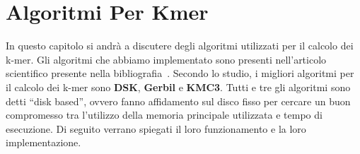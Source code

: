 \chapter{Algoritmi Per Kmer}

\label{ch:algoritmiperkmer}
In questo capitolo si andr\`a a discutere degli algoritmi utilizzati per il calcolo dei k-mer.
Gli algoritmi che abbiamo implementato sono presenti nell'articolo scientifico presente nella bibliografia~\cite{algoritmiK-mer}.
Secondo lo studio, i migliori algoritmi per il calcolo dei k-mer sono \textbf{DSK}, \textbf{Gerbil} e \textbf{KMC3}.
Tutti e tre gli algoritmi sono detti ``disk based'', ovvero fanno affidamento sul disco fisso per cercare un buon compromesso
tra l'utilizzo della memoria principale utilizzata e tempo di esecuzione.
Di seguito verrano spiegati il loro funzionamento e la loro implementazione.

